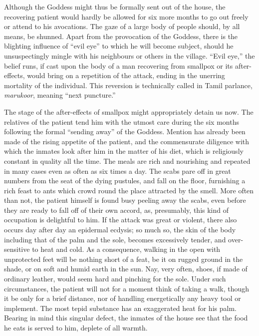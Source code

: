 \documentclass[a4paper, 12pt, oneside, english, twocolumn]{article}
\begin{document}
Although the Goddess might thus be formally sent out of the house, the recovering patient would hardly be allowed for six more months to go out freely or attend to his avocations. The gaze of a large body of people should, by all means, be shunned. Apart from the provocation of the Goddess, there is the blighting influence of ``evil eye'' to which he will become subject, should he unsuspectingly mingle with his neighbours or others in the village. ``Evil eye,'' the belief runs, if cast upon the body of a man recovering from smallpox or its after-effects, would bring on a repetition of the attack, ending in the unerring mortality of the individual. This reversion is technically called in Tamil parlance, \emph{marukoor}, meaning ``next puncture.''

The stage of the after-effects of smallpox might appropriately detain us now. The relatives of the patient tend him with the utmost care during the six months following the formal ``sending away'' of the Goddess. Mention has already been made of the rising appetite of the patient, and the commensurate diligence with which the inmates look after him in the matter of his diet, which is religiously constant in quality all the time. The meals are rich and nourishing and repeated in many cases even as often as six times a day. The scabs pare off in great numbers from the seat of the dying pustules, and fall on the floor, furnishing a rich feast to ants which crowd round the place attracted by the smell. More often than not, the patient himself is found busy peeling away the scabs, even before they are ready to fall off of their own accord, as, presumably, this kind of occupation is delightful to him. If the attack was great or violent, there also occurs day after day an epidermal ecdysis; so much so, the skin of the body including that of the palm and the sole, becomes excessively tender, and over-sensitive to heat and cold. As a consequence, walking in the open with unprotected feet will be nothing short of a feat, be it on rugged ground in the shade, or on soft and humid earth in the sun. Nay, very often, shoes, if made of ordinary leather, would seem hard and pinching for the sole. Under such circumstances, the patient will not for a moment think of taking a walk, though it be only for a brief distance, nor of handling energetically any heavy tool or implement. The most tepid substance has an exaggerated heat for his palm. Bearing in mind this singular defect, the inmates of the house see that the food he eats is served to him, deplete of all warmth.
\end{document}
